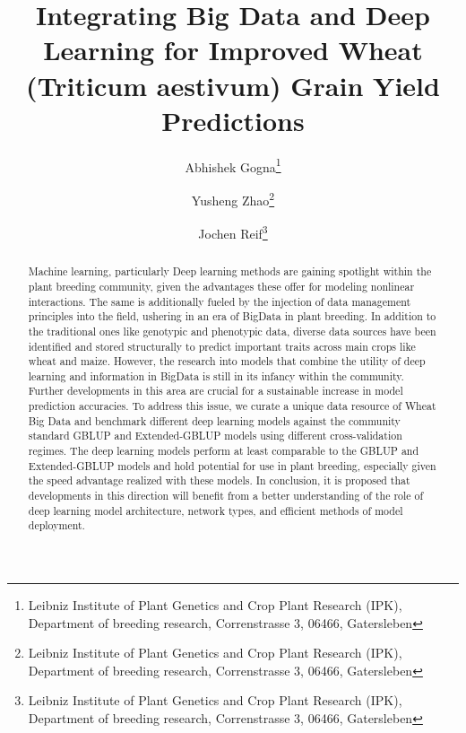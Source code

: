 \documentclass[english, biblatex]{lni}
\begin{document}
\title[AI in Plant Breeding]{Integrating Big Data and Deep Learning for Improved Wheat (Triticum aestivum) Grain Yield Predictions}
\author[Abhishek Gogna \and Yusheng Zhao \and Jochen C. Reif]
{Abhishek Gogna\footnote{Leibniz Institute of Plant Genetics and Crop Plant Research (IPK), Department of breeding research, Correnstrasse 3, 06466, Gatersleben } \and
Yusheng Zhao\footnote{Leibniz Institute of Plant Genetics and Crop Plant Research (IPK), Department of breeding research, Correnstrasse 3, 06466, Gatersleben } \and
Jochen Reif\footnote{Leibniz Institute of Plant Genetics and Crop Plant Research (IPK), Department of breeding research, Correnstrasse 3, 06466, Gatersleben }}
\maketitle
\begin{abstract}
Machine learning, particularly Deep learning methods are gaining spotlight within the plant breeding community, given the advantages these offer for modeling nonlinear interactions. The same is additionally fueled by the injection of data management principles into the field, ushering in an era of BigData in plant breeding. In addition to the traditional ones like genotypic and phenotypic data, diverse data sources have been identified and stored structurally to predict important traits across main crops like wheat and maize. However, the research into models that combine the utility of deep learning and information in BigData is still in its infancy within the community. Further developments in this area are crucial for a sustainable increase in model prediction accuracies. To address this issue, we curate a unique data resource of Wheat Big Data and benchmark different deep learning models against the community standard GBLUP and Extended-GBLUP models using different cross-validation regimes. The deep learning models perform at least comparable to the GBLUP and Extended-GBLUP models and hold potential for use in plant breeding, especially given the speed advantage realized with these models. In conclusion, it is proposed that developments in this direction will benefit from a better understanding of the role of deep learning model architecture, network types, and efficient methods of model deployment.
\end{abstract}
\end{document}
